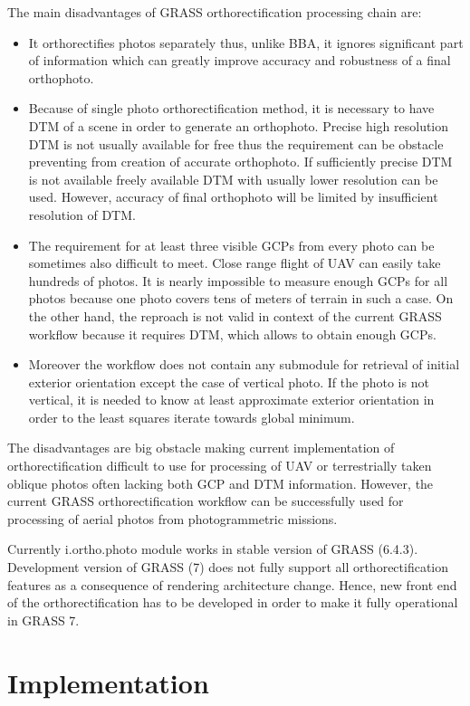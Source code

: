 \documentclass[a4paper,12pt]{article}
\begin{document}
The main disadvantages of GRASS orthorectification processing chain are:
\begin{itemize}
\item It orthorectifies photos separately thus, unlike BBA, it ignores significant part of information
 which can greatly improve accuracy and robustness of a final orthophoto. 
\item Because of single photo orthorectification method, it is necessary to have DTM of a scene
in order to generate an orthophoto. Precise high resolution DTM is not usually available for free thus the 
requirement can be obstacle preventing from creation of accurate orthophoto. If sufficiently precise 
DTM is not available freely available DTM with usually lower resolution can be used. However,  
accuracy of final orthophoto will be limited by insufficient resolution of DTM.
\item The requirement for at least three visible GCPs from every photo can be sometimes also difficult to meet.
Close range flight of UAV can easily take hundreds of photos.
It is nearly impossible to measure enough GCPs for all photos because  
one photo covers tens of meters of terrain in such a case. 
On the other hand, the reproach is not valid in context of the current GRASS workflow because it requires DTM, which allows 
to obtain enough GCPs.
\item Moreover the workflow does not contain any submodule for retrieval of initial exterior orientation except
 the case of vertical photo.   If the photo 
is not vertical, it is needed to know at least approximate exterior orientation 
in order to the least squares iterate towards global minimum.
\end{itemize}

The disadvantages are big obstacle making current implementation of orthorectification difficult to use  
for processing of  UAV or terrestrially taken oblique photos often lacking both GCP and DTM information.
However, the current GRASS orthorectification workflow can be successfully used for processing
of aerial photos from photogrammetric missions.

Currently i.ortho.photo module works in stable version of GRASS (6.4.3).
Development version of GRASS (7) does not fully support all orthorectification features 
as a consequence of rendering architecture change.
Hence, new front end of the
orthorectification has to be developed in order to make it fully operational 
in GRASS 7. 

\section{Implementation}
\end{document}
